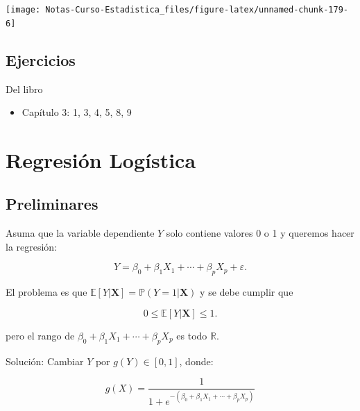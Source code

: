 \documentclass[
  12pt,
]{book}
\providecommand{\tightlist}{%
  \setlength{\itemsep}{0pt}\setlength{\parskip}{0pt}}
\theoremstyle{definition}
\theoremstyle{definition}
\theoremstyle{definition}
\theoremstyle{definition}
\theoremstyle{remark}
\begin{document}
\begin{center}\texttt{[image: Notas-Curso-Estadistica\_files/figure-latex/unnamed-chunk-179-6]} \end{center}

\hypertarget{ejercicios-2}{%
\section{Ejercicios}\label{ejercicios-2}}

Del libro \autocite{James2013b}

\begin{itemize}
\tightlist
\item
  Capítulo 3: 1, 3, 4, 5, 8, 9
\end{itemize}

\hypertarget{regresiuxf3n-loguxedstica}{%
\chapter{Regresión Logística}\label{regresiuxf3n-loguxedstica}}

\hypertarget{preliminares}{%
\section{Preliminares}\label{preliminares}}

Asuma que la variable dependiente \(Y\) solo contiene valores 0 o 1 y queremos hacer la regresión:

\begin{equation*}
Y = \beta_{0} +\beta_{1} X_{1} + \cdots + \beta_{p} X_{p} + \varepsilon.
\end{equation*}

El problema es que \(\mathbb{E}\left[Y | \boldsymbol{X}\right] = \mathbb{P}\left(Y=1\vert \boldsymbol{X}\right)\) y se debe cumplir que

\begin{equation*}
0\leq \mathbb{E}\left[Y | \boldsymbol{X}\right]\leq 1.
\end{equation*}

pero el rango de \(\beta_{0} +\beta_{1} X_{1} + \cdots + \beta_{p} X_{p}\) es todo \(\mathbb{R}\).

Solución: Cambiar \(Y\) por \(g(Y)\in [0,1]\), donde:

\begin{equation*}
g(X) = \frac{1}{1+e^{-(\beta_{0} +\beta_{1} X_{1} + \cdots + \beta_{p} X_{p})}}
\end{equation*}
\end{document}
